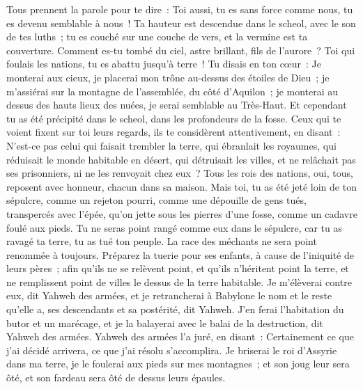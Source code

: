 \begin{multicols}{2}
Tous prennent la parole pour te dire~: Toi aussi, tu es sans force comme nous, tu es devenu semblable à nous~!
Ta hauteur est descendue dans le scheol, avec le son de tes luths~; tu es couché sur une couche de vers, et la vermine est ta couverture.
Comment es-tu tombé du ciel, astre brillant, fils de l'aurore~? Toi qui foulais les nations, tu es abattu jusqu'à terre~!
Tu disais en ton cœur~: Je monterai aux cieux, je placerai mon trône au-dessus des étoiles de Dieu~; je m'assiérai sur la montagne de l'assemblée, du côté d'Aquilon~;
je monterai au dessus des hauts lieux des nuées, je serai semblable au Très-Haut.
Et cependant tu as été précipité dans le scheol, dans les profondeurs de la fosse.
Ceux qui te voient fixent sur toi leurs regards, ils te considèrent attentivement, en disant~: N'est-ce pas celui qui faisait trembler la terre, qui ébranlait les royaumes,
qui réduisait le monde habitable en désert, qui détruisait les villes, et ne relâchait pas ses prisonniers, ni ne les renvoyait chez eux~?
Tous les rois des nations, oui, tous, reposent avec honneur, chacun dans sa maison.
Mais toi, tu as été jeté loin de ton sépulcre, comme un rejeton pourri, comme une dépouille de gens tués, transpercés avec l'épée, qu'on jette sous les pierres d'une fosse, comme un cadavre foulé aux pieds.
Tu ne seras point rangé comme eux dans le sépulcre, car tu as ravagé ta terre, tu as tué ton peuple. La race des méchants ne sera point renommée à toujours.
Préparez la tuerie pour ses enfants, à cause de l'iniquité de leurs pères~; afin qu'ils ne se relèvent point, et qu'ils n'héritent point la terre, et ne remplissent point de villes le dessus de la terre habitable.
Je m'élèverai contre eux, dit Yahweh des armées, et je retrancherai à Babylone le nom et le reste qu'elle a, ses descendants et sa postérité, dit Yahweh.
J'en ferai l'habitation du butor et un marécage, et je la balayerai avec le balai de la destruction, dit Yahweh des armées.
Yahweh des armées l'a juré, en disant~: Certainement ce que j'ai décidé arrivera, ce que j'ai résolu s'accomplira.
Je briserai le roi d'Assyrie dans ma terre, je le foulerai aux pieds sur mes montagnes~; et son joug leur sera ôté, et son fardeau sera ôté de dessus leurs épaules.

\end{multicols}

